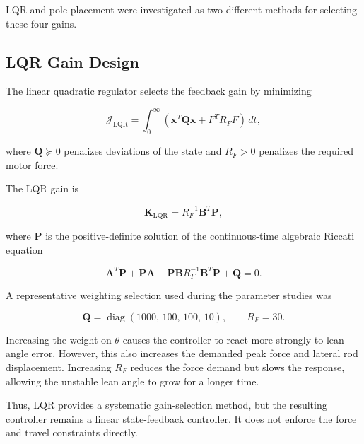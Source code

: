 LQR and pole placement were investigated as two different methods for selecting these four gains.

\subsection{LQR Gain Design}
\label{subsec:lqr-design}

The linear quadratic regulator selects the feedback gain by minimizing

\begin{equation}
\mathcal{J}_{\mathrm{LQR}}
=
\int_{0}^{\infty}
\left(
\mathbf{x}^{T}\mathbf{Q}\mathbf{x}
+
F^{T}R_FF
\right)
\,dt,
\label{eq:lqr-cost}
\end{equation}

where $\mathbf{Q}\succeq0$ penalizes deviations of the state and $R_F>0$ penalizes the required motor force.

The LQR gain is

\begin{equation}
\mathbf{K}_{\mathrm{LQR}}
=
R_F^{-1}\mathbf{B}^{T}\mathbf{P},
\end{equation}

where $\mathbf{P}$ is the positive-definite solution of the continuous-time algebraic Riccati equation

\begin{equation}
\mathbf{A}^{T}\mathbf{P}
+
\mathbf{P}\mathbf{A}
-
\mathbf{P}\mathbf{B}R_F^{-1}\mathbf{B}^{T}\mathbf{P}
+
\mathbf{Q}
=
0.
\end{equation}

A representative weighting selection used during the parameter studies was

\begin{equation}
\mathbf{Q}
=
\operatorname{diag}
\left(
1000,\,
100,\,
100,\,
10
\right),
\qquad
R_F=30.
\label{eq:representative-lqr-weights}
\end{equation}

Increasing the weight on $\theta$ causes the controller to react more strongly to lean-angle error. However, this also increases the demanded peak force and lateral rod displacement. Increasing $R_F$ reduces the force demand but slows the response, allowing the unstable lean angle to grow for a longer time.

Thus, LQR provides a systematic gain-selection method, but the resulting controller remains a linear state-feedback controller. It does not enforce the force and travel constraints directly.


